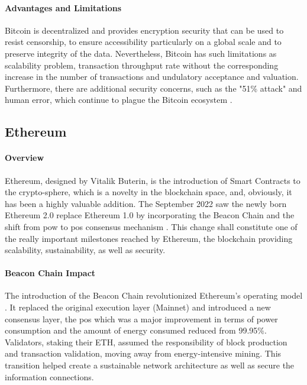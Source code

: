 \paragraph{Advantages and Limitations}

Bitcoin is decentralized and provides encryption security that can be used to resist censorship, to ensure accessibility particularly on a global scale and to preserve integrity 
of the data. Nevertheless, Bitcoin has such limitations as scalability problem, transaction throughput rate without the corresponding increase in the number of transactions 
and undulatory acceptance and valuation. Furthermore, there are additional security concerns, such as the "51\% attack" and human error, which continue to plague the Bitcoin 
ecosystem \cite{9129332}.

\subsection{Ethereum} \label{subsec:ethereum}

\paragraph{Overview}

Ethereum, designed by Vitalik Buterin, is the introduction of Smart Contracts to the crypto-sphere, which is a novelty in the blockchain space, and, obviously, it has been 
a highly valuable addition. The September 2022 saw the newly born Ethereum 2.0 replace Ethereum 1.0 by incorporating the Beacon Chain and the shift from \gls{pow} 
to \gls{pos} consensus mechanism \cite{ethereummerge}. This change shall constitute one of the really important milestones reached by Ethereum, the blockchain providing 
scalability, sustainability, as well as security.

\paragraph{Beacon Chain Impact}

The introduction of the Beacon Chain revolutionized Ethereum's operating model \cite{ethereummerge}. It replaced the original execution layer (Mainnet) and introduced a new consensus layer, 
the \gls{pos} which was a major improvement in terms of power consumption and the amount of energy consumed reduced from 99.95\%. Validators, staking their ETH, assumed the 
responsibility of block production and transaction validation, moving away from energy-intensive mining. This transition helped create a sustainable network 
architecture as well as secure the information connections.

